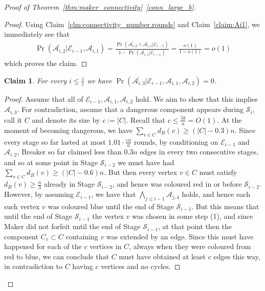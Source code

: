 \documentclass[11pt, a4paper]{article}
\numberwithin{equation}{section}
\numberwithin{figure}{section}
\newtheorem{claim}[theorem]{Claim}
\newcommand{\Prob}{\operatorname{Pr}}
\begin{document}
\begin{proof}[Proof of Theorem~\ref{thm:maker_connectivity}~\ref{conn_large_b}]
\begin{proof}
Using Claim~\ref{clm:connectivity_number.rounds}
and Claim~\ref{claim:Ai1}, we immediately see that
\begin{align*}
\Prob(\overline{\mathcal{A}_{i,2}}|\mathcal{E}_{i-1},\mathcal{A}_{i,1})
=
\frac{\Prob(\overline{\mathcal{A}_{i,2}} \land \mathcal{A}_{i,1}|\mathcal{E}_{i-1})}{
1- \Prob(\overline{\mathcal{A}_{i,1}}|\mathcal{E}_{i-1}) }
=
\frac{o(1)}{1-o(1)} 
=
o(1)
\end{align*}
which proves the claim.
\end{proof}



\begin{claim}
For every $i\leq \frac{1}{\varepsilon}$ we have
$\Prob(\overline{\mathcal{A}_{i,3}}|\mathcal{E}_{i-1},\mathcal{A}_{i,1},\mathcal{A}_{i,2})=0$.
\end{claim}

\begin{proof}
Assume that all of 
$\mathcal{E}_{i-1},\mathcal{A}_{i,1},\mathcal{A}_{i,2}$ hold. We aim to show that this implies $\mathcal{A}_{i,3}$.
For contradiction,
assume that a dangerous component appears during 
$\mathcal{S}_{i}$, call it $C$ and denote its size by $c:=|C|$. Recall that $c\leq \frac{5b}{a}=O(1)$.
At the moment of becoming dangerous, we have
$\sum_{v\in C} d_B(v) \geq (|C|-0.3) n$.
Since every stage so far lasted at most $1.01\cdot \frac{\varepsilon n}{a}$ rounds,
by conditioning on $\mathcal{E}_{i-1}$ and $\mathcal{A}_{i,2}$, Breaker so far claimed less than 
$0.3n$ edges in every two consecutive stages, and
so at some point in Stage $\mathcal{S}_{i-2}$ we must have had
$\sum_{v\in C} d_B(v) \geq (|C|-0.6) n$.
But then every vertex $v\in C$ must 
satisfy $d_B(v)\geq \frac{n}{3}$ 
already in Stage $\mathcal{S}_{i-2}$,
and hence was coloured red
in or before $\mathcal{S}_{i-2}$.
However, by assuming $\mathcal{E}_{i-1}$,
we have that $\bigwedge_{j\leq i-1} \mathcal{A}_{j,4}$
holds, and hence each such vertex $v$ was coloured blue until the end of Stage $\mathcal{S}_{i-1}$. But this means that until the end of Stage $\mathcal{S}_{i-1}$ the vertex $v$ was chosen in some step (1),
and since Maker did not forfeit until the end of Stage
$\mathcal{S}_{i-1}$,
at that point then the component $C_v\subset C$ containing $v$ was extended by an edge.
Since this must have happened for each of the $c$ vertices in $C$, always when they were coloured from red to blue,
we can conclude that $C$ must have obtained at least $c$ edges this way, in contradiction to $C$ having $c$ vertices and no cycles.
\end{proof}



\end{proof}
\end{document}
